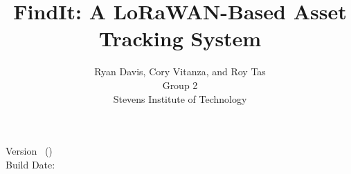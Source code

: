 
\begin{titlepage}
    \title{FindIt: A LoRaWAN-Based Asset Tracking System}
    \author{Ryan Davis, Cory Vitanza, and Roy Tas \\[0.5em]
            Group 2 \\ Stevens Institute of Technology}

    \maketitle

    \vspace{2em}
    \begin{center}
        {\large Version \version\ (\commit)}\\[0.3em]
        {\small Build Date: \builddate}
    \end{center}
\end{titlepage}

\makecopyright

\begin{abstract}
\end{abstract}

%     

\contentspage

\tablelistpage
\figurelistpage
